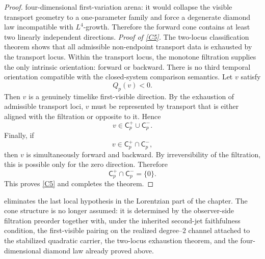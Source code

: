 \begin{proof}
	four-dimensional first-variation arena: it would collapse the visible
	transport geometry to a one-parameter family and force a degenerate
	diamond law incompatible with \(L^4\)-growth.  Therefore the forward
	cone contains at least two linearly independent directions.
	\smallskip
	\noindent
	\textit{Proof of \textup{\ref{C5}}.}
	The two-locus classification theorem shows that all admissible
	non-endpoint transport data is exhausted by the transport locus.
	Within the transport locus, the monotone filtration supplies the only
	intrinsic orientation: forward or backward.  There is no third temporal
	orientation compatible with the closed-system comparison semantics.
	Let \(v\) satisfy
	\[
		Q_p(v)<0.
	\]
	Then \(v\) is a genuinely timelike first-visible direction.  By the
	exhaustion of admissible transport loci, \(v\) must be represented by
	transport that is either aligned with the filtration or opposite to it.
	Hence
	\[
		v\in \mathsf C_p^+\cup \mathsf C_p^-.
	\]
	Finally, if
	\[
		v\in \mathsf C_p^+\cap \mathsf C_p^-,
	\]
	then \(v\) is simultaneously forward and backward.  By irreversibility
	of the filtration, this is possible only for the zero direction.
	Therefore
	\[
		\mathsf C_p^+\cap \mathsf C_p^-=\{0\}.
	\]
	This proves \textup{\ref{C5}} and completes the theorem.
\end{proof}
\begin{remark}
	 eliminates the last local hypothesis in the
	Lorentzian part of the chapter.  The cone structure is no longer
	assumed: it is determined by the observer-side filtration preorder
	together with, under the inherited second-jet faithfulness condition,
	the first-visible pairing on the realized degree--\(2\) channel
	attached to the stabilized quadratic carrier, the two-locus
	exhaustion theorem, and the four-dimensional diamond law already
	proved above.
\end{remark}
